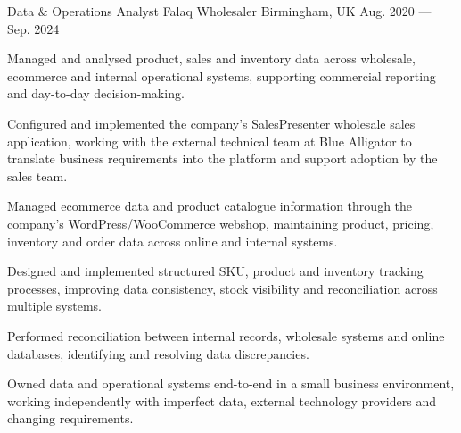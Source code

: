 \begin{cventries}
  \cventry
  {Data \& Operations Analyst} %
  {Falaq Wholesaler } %
  {Birmingham, UK} %
  {Aug. 2020 --- Sep. 2024} %
  {
    \begin{cvitems}
    \item {Managed and analysed product, sales and inventory data across wholesale, ecommerce and internal operational systems, supporting commercial reporting and day-to-day decision-making.}
    \item {Configured and implemented the company's SalesPresenter wholesale sales application, working with the external technical team at Blue Alligator to translate business requirements into the platform and support adoption by the sales team.}
    \item {Managed ecommerce data and product catalogue information through the company's WordPress/WooCommerce webshop, maintaining product, pricing, inventory and order data across online and internal systems.}
    \item {Designed and implemented structured SKU, product and inventory tracking processes, improving data consistency, stock visibility and reconciliation across multiple systems.}
    \item {Performed reconciliation between internal records, wholesale systems and online databases, identifying and resolving data discrepancies.}
    \item {Owned data and operational systems end-to-end in a small business environment, working independently with imperfect data, external technology providers and changing requirements.}
    \end{cvitems}
  }


\end{cventries}

